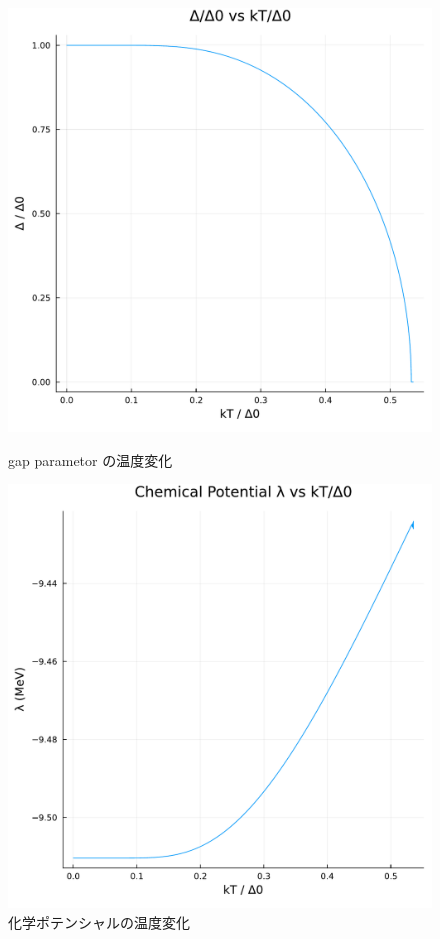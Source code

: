 \documentclass[a4paper,10pt]{jsarticle}
\begin{document}
\begin{figure}[H]
  \begin{minipage}[b]{0.4\textwidth}
    \centering
    \includegraphics[width=\textwidth]{1.pdf}
    \caption{gap parametor の温度変化}
  \end{minipage}
  \begin{minipage}[b]{0.4\textwidth}
    \centering
    \includegraphics[width=\textwidth]{2.pdf}
    \caption{化学ポテンシャルの温度変化}
  \end{minipage}
\end{figure}
\end{document}
